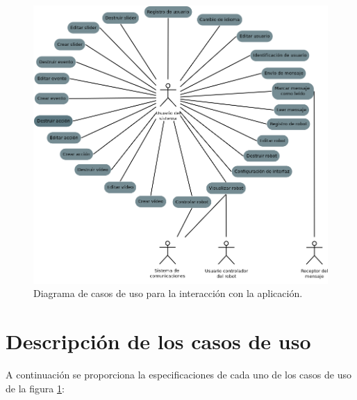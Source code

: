 \begin{figure}[H]
  \begin{center}
    \includegraphics[scale=.5]{diagramas/casos-uso.png}
  \end{center}
  \caption{Diagrama de casos de uso para la interacción con la aplicación.}
  \label{diagram:caso-uso}
\end{figure}


\section{Descripción de los casos de uso}
\label{sec:especificaciones-caso-uso}

A continuación se proporciona la especificaciones de cada uno de los casos de uso de la figura \ref{diagram:caso-uso}:


